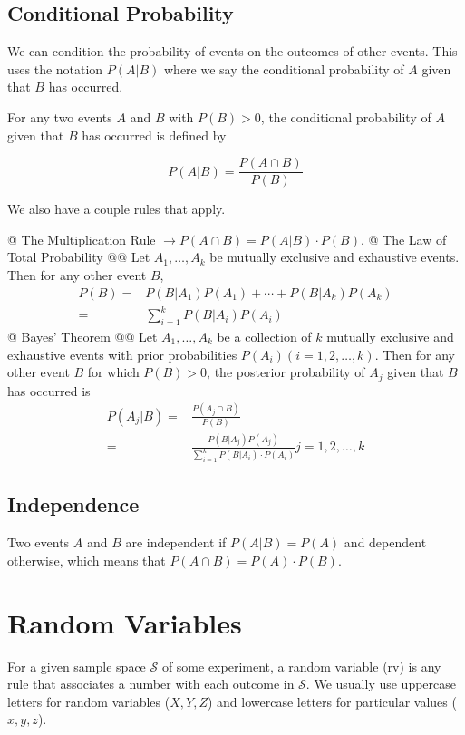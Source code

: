     \subsection{Conditional Probability}
    We can condition the probability of events on the outcomes of other events. This uses the notation $P(A|B)$ where we
    say the conditional probability of $A$ given that $B$ has occurred.

    For any two events $A$ and $B$ with $P(B) > 0$, the conditional probability of $A$ given that $B$ has occurred is
    defined by

        \[ P(A|B) = \frac{P(A \cap B)}{P(B)} \]

    We also have a couple rules that apply.

        \NewList
        \begin{easylist}
            @ The Multiplication Rule $ \to P(A \cap B) = P(A|B) \cdot P(B)$.
            @ The Law of Total Probability
            @@ Let $A_1, \ldots, A_k$ be mutually exclusive and exhaustive events. Then for any other event $B$,
                \[ \begin{aligned} 
                    P(B) =& P(B|A_1)P(A_1) + \cdots + P(B|A_k)P(A_k)\\
                         =& \sum^k_{i=1} P(B|A_i)P(A_i)
                \end{aligned} \]
            @ Bayes' Theorem
            @@ Let $A_1, \ldots, A_k$ be a collection of $k$ mutually exclusive and exhaustive events with prior
            probabilities $P(A_i) (i = 1, 2, \ldots, k)$. Then for any other event $B$ for which $P(B) > 0$, the
            posterior probability of $A_j$ given that $B$ has occurred is
                \[ \begin{aligned}
                    P(A_j|B) =& \frac{P(A_j \cap B)}{P(B)}\\
                             =& \frac{P(B|A_j)P(A_j)}{\sum^k_{i=1} P(B|A_i) \cdot P(A_i)}
                    j = 1, 2, \ldots, k
                \end{aligned} \]
        \end{easylist}

    \subsection{Independence}
    Two events $A$ and $B$ are independent if $P(A|B) = P(A)$ and dependent otherwise, which means that $P(A \cap B) =
    P(A) \cdot P(B)$.

\section{Random Variables}
For a given sample space $\mathcal{S}$ of some experiment, a random variable (rv) is any rule that associates a number
with each outcome in $\mathcal{S}$. We usually use uppercase letters for random variables ($X, Y, Z$) and lowercase
letters for particular values ($x, y, z$).

